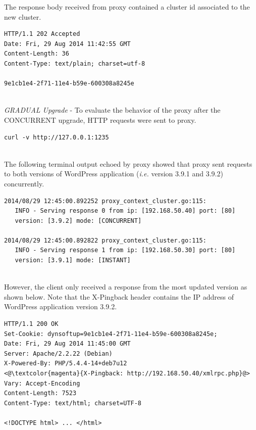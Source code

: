 \documentclass[a4paper,11pt,twoside]{report}
\begin{document}
\noindent
The response body received from proxy contained a cluster id associated to the new cluster.

\begin{lstlisting}[language=terminal]
HTTP/1.1 202 Accepted
Date: Fri, 29 Aug 2014 11:42:55 GMT
Content-Length: 36
Content-Type: text/plain; charset=utf-8

9e1cb1e4-2f71-11e4-b59e-600308a8245e
\end{lstlisting} 

\noindent\\
\textit{GRADUAL Upgrade} - To evaluate the behavior of the proxy after the CONCURRENT upgrade, HTTP requests were sent to proxy. \smallskip

\begin{lstlisting}[language=terminal]
curl -v http://127.0.0.1:1235
\end{lstlisting}

\noindent\\ 
The following terminal output echoed by proxy showed that proxy sent requests to both versions of WordPress application (\textit{i.e.} version 3.9.1 and 3.9.2) concurrently. 

\begin{lstlisting}[language=terminal]
2014/08/29 12:45:00.892252 proxy_context_cluster.go:115:     
   INFO - Serving response 0 from ip: [192.168.50.40] port: [80] 
   version: [3.9.2] mode: [CONCURRENT]

2014/08/29 12:45:00.892822 proxy_context_cluster.go:115:     
   INFO - Serving response 1 from ip: [192.168.50.30] port: [80] 
   version: [3.9.1] mode: [INSTANT]
\end{lstlisting}

\noindent\\
However, the client only received a response from the most updated version as shown below. Note that the X-Pingback header contains the IP address of WordPress application version 3.9.2. \smallskip

\begin{lstlisting}[language=terminal]
HTTP/1.1 200 OK
Set-Cookie: dynsoftup=9e1cb1e4-2f71-11e4-b59e-600308a8245e;
Date: Fri, 29 Aug 2014 11:45:00 GMT
Server: Apache/2.2.22 (Debian)
X-Powered-By: PHP/5.4.4-14+deb7u12
<@\textcolor{magenta}{X-Pingback: http://192.168.50.40/xmlrpc.php}@>
Vary: Accept-Encoding
Content-Length: 7523
Content-Type: text/html; charset=UTF-8

<!DOCTYPE html> ... </html>
\end{lstlisting}
\end{document}
